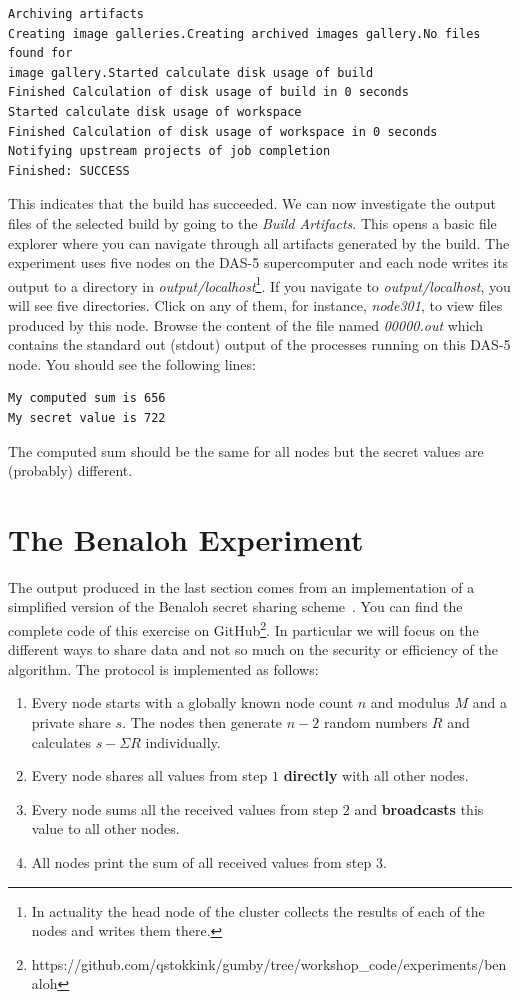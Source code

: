 \documentclass{article}
\begin{document}
\begin{lstlisting}[frame=single]  % Start your code-block
Archiving artifacts
Creating image galleries.Creating archived images gallery.No files found for
image gallery.Started calculate disk usage of build
Finished Calculation of disk usage of build in 0 seconds
Started calculate disk usage of workspace
Finished Calculation of disk usage of workspace in 0 seconds
Notifying upstream projects of job completion
Finished: SUCCESS
\end{lstlisting}

This indicates that the build has succeeded.
We can now investigate the output files of the selected build by going to the \emph{Build Artifacts}.
This opens a basic file explorer where you can navigate through all artifacts generated by the build.
The experiment uses five nodes on the DAS-5 supercomputer and each node writes its output to a directory in \emph{output/localhost}\footnote{In actuality the head node of the cluster collects the results of each of the nodes and writes them there.}.
If you navigate to \emph{output/localhost}, you will see five directories.
Click on any of them, for instance, \emph{node301}, to view files produced by this node.
Browse the content of the file named \emph{00000.out} which contains the standard out (stdout) output of the processes running on this DAS-5 node.
You should see the following lines:

\begin{lstlisting}[frame=single]
My computed sum is 656
My secret value is 722
\end{lstlisting}

The computed sum should be the same for all nodes but the secret values are (probably) different.

\section{The Benaloh Experiment}
The output produced in the last section comes from an implementation of a simplified version of the Benaloh secret sharing scheme~\cite{benaloh1990generalized}.
You can find the complete code of this exercise on GitHub\footnote{https://github.com/qstokkink/gumby/tree/workshop\_code/experiments/benaloh}.
In particular we will focus on the different ways to share data and not so much on the security or efficiency of the algorithm.
The protocol is implemented as follows:

\begin{enumerate}
\item Every node starts with a globally known node count $n$ and modulus $M$ and a private share $s$.
The nodes then generate $n-2$ random numbers $R$ and calculates $s - \Sigma R$ individually.
\item Every node shares all values from step $1$ \textbf{directly} with all other nodes.
\item Every node sums all the received values from step $2$ and \textbf{broadcasts} this value to all other nodes.
\item All nodes print the sum of all received values from step $3$.
\end{enumerate}
\end{document}
